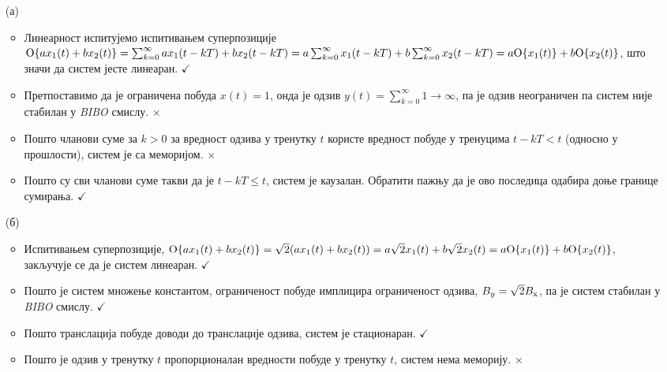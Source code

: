 \begin{enumerate}
    \item[(а)] 
    \begin{itemize}
    \item Линеарност испитујемо испитивањем суперпозиције
    ${\rm O}\{ a x_1(t) + b x_2(t) \} = \sum_{k = 0}^{\infty} ax_1(t-kT) + bx_2(t-kT) = 
    a \sum_{k = 0}^{\infty} x_1(t-kT) + b  \sum_{k = 0}^{\infty} x_2(t-kT) = a {\rm O}\{x_1(t)\} + b {\rm O}\{x_2(t)\}$,
    што значи да систем јесте линеаран.  \hfill $\checkmark$

    \item Претпоставимо да је ограничена побуда $x(t) = 1$, онда је одзив $y(t) = \sum_{k = 0}^{\infty} 1 \to \infty$, 
    па је одзив неограничен па систем није стабилан у \textit{BIBO} смислу. \hfill $\times$

    \item Пошто чланови суме за $k > 0$ за вредност одзива у тренутку $t$ користе вредност побуде у тренуцима $t - kT < t$
    (односно у прошлости), систем је са меморијом. \hfill $\times$
    
    \item Пошто су сви чланови суме такви да је $t - kT \leq t$, систем је каузалан. Обратити пажњу да је ово 
    последица одабира доње границе сумирања.  \hfill $\checkmark$
    \end{itemize}

    \item[(б)]
    \begin{itemize}
        \item Испитивањем суперпозиције, ${\rm O}\{ a x_1(t) + b x_2(t) \} = \sqrt2 (ax_1(t) + bx_2(t)) = 
        a \sqrt 2 x_1(t) + b \sqrt 2 x_2(t)
        = a {\rm O}\{x_1(t)\} + b {\rm O}\{x_2(t)\}$, закључује се да је систем линеаран. \hfill $\checkmark$

        \item Пошто је систем множење константом, ограниченост побуде имплицира ограниченост одзива,
        $B_{y} = \sqrt 2 B_{\rm x}$, па је систем стабилан у \textit{BIBO} смислу. \hfill $\checkmark$

        \item Пошто транслација побуде доводи до транслације одзива, систем је стационаран. \hfill $\checkmark$

        \item Пошто је одзив у тренутку $t$ пропорционалан вредности побуде у тренутку $t$, систем нема меморију. \hfill $\times$
        

\end{itemize}
\end{enumerate}
